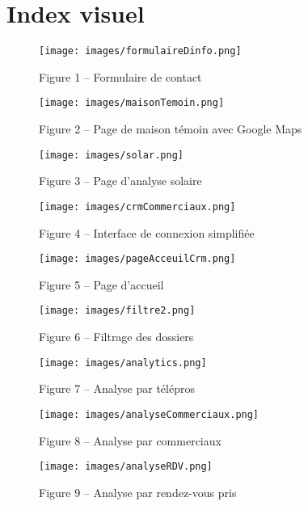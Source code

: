 \section*{Index visuel}

\begin{figure}[H]
    \centering
    \texttt{[image: images/formulaireDinfo.png]}
    \caption*{Figure 1 – Formulaire de contact}
\end{figure}

\begin{figure}[H]
    \centering
    \texttt{[image: images/maisonTemoin.png]}
    \caption*{Figure 2 – Page de maison témoin avec Google Maps}
\end{figure}

\begin{figure}[H]
    \centering
    \texttt{[image: images/solar.png]}
    \caption*{Figure 3 – Page d’analyse solaire}
\end{figure}

\newpage

\begin{figure}[H]
    \centering
    \texttt{[image: images/crmCommerciaux.png]}
    \caption*{Figure 4 – Interface de connexion simplifiée}
\end{figure}

\begin{figure}[H]
    \centering
    \texttt{[image: images/pageAcceuilCrm.png]}
    \caption*{Figure 5 – Page d'accueil}
\end{figure}

\begin{figure}[H]
    \centering
    \texttt{[image: images/filtre2.png]}
    \caption*{Figure 6 – Filtrage des dossiers}
\end{figure}

\newpage

\begin{figure}[H]
    \centering
    \texttt{[image: images/analytics.png]}
    \caption*{Figure 7 – Analyse par télépros}
\end{figure}

\begin{figure}[H]
    \centering
    \texttt{[image: images/analyseCommerciaux.png]}
    \caption*{Figure 8 – Analyse par commerciaux}
\end{figure}

\begin{figure}[H]
    \centering
    \texttt{[image: images/analyseRDV.png]}
    \caption*{Figure 9 – Analyse par rendez-vous pris}
\end{figure}
